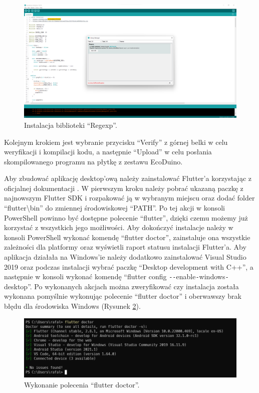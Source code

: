 \documentclass[a4paper,twoside,12pt]{book}
\begin{document}
\begin{figure}[H]
   \centering
   \includegraphics[width=\textwidth]{./assets/img/img009.png}
   \caption{Instalacja biblioteki ``Regexp''.}
   \label{fig:9}
\end{figure}

Kolejnym krokiem jest wybranie przycisku ``Verify'' z górnej belki w celu weryfikacji i kompilacji kodu, a następnie ``Upload'' w celu posłania skompilowanego programu na płytkę z zestawu EcoDuino.

Aby zbudować aplikację desktop'ową należy zainstalować Flutter'a korzystając z oficjalnej dokumentacji \cite{bib:url005}. W pierwszym kroku należy pobrać ukazaną paczkę z najnowszym Flutter SDK i rozpakować ją w wybranym miejscu oraz dodać folder ``flutter\textbackslash bin'' do zmiennej środowiskowej ``PATH''. Po tej akcji w konsoli PowerShell powinno być dostępne polecenie ``flutter'', dzięki czemu możemy już korzystać z wszystkich jego możliwości. Aby dokończyć instalacje należy w konsoli PowerShell wykonać komendę ``flutter doctor'', zainstaluje ona wszystkie zależności dla platformy oraz wyświetli raport statusu instalacji Flutter'a. Aby aplikacja działała na Windows'ie należy dodatkowo zainstalować Visual Studio 2019 oraz podczas instalacji wybrać paczkę ``Desktop development with C++'', a następnie w konsoli wykonać komendę ``flutter config \texttt{-{}-}enable\texttt{-}windows\texttt{-}desktop''. Po wykonanych akcjach można zweryfikować czy instalacja została wykonana pomyślnie wykonując polecenie ``flutter doctor'' i oberwawszy brak błędu dla środowiska Windows (Rysunek \ref{fig:10}).

\begin{figure}[H]
   \centering
   \includegraphics[width=\textwidth]{./assets/img/img010.png}
   \caption{Wykonanie polecenia ``flutter doctor''.}
   \label{fig:10}
\end{figure}
\end{document}
